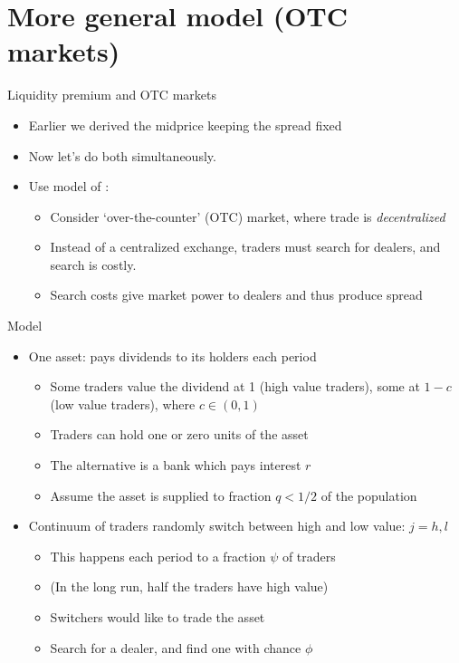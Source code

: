 \documentclass[english,10pt
,aspectratio=169
]{beamer}
\begin{document}
\section{More general model (OTC markets)}

\begin{frame}{Liquidity premium and OTC markets}
	\begin{itemize}
		\item Earlier we derived the midprice keeping the spread fixed
		\item Now let's do both simultaneously.
		\item Use model of \citet*{duffie_over--counter_2005,duffie_valuation_2007}:
		\begin{itemize}
			\item Consider `over-the-counter' (OTC) market, where trade is \textit{decentralized}
			\item Instead of a centralized exchange, traders must search for dealers, and search is costly.
			\item Search costs give market power to dealers and thus produce spread
		\end{itemize}
	\end{itemize}
\end{frame}


\begin{frame}{Model}
	\begin{itemize}
		\item One asset: pays dividends to its holders each period
		\begin{itemize}
			\item Some traders value the dividend at 1 (high value traders), some at $1-c$ (low value traders), where $c \in (0,1)$
			\item Traders can hold \alert{one} or \alert{zero units} of the asset
			\item The alternative is a bank which pays interest $r$
			\item Assume the asset is supplied to fraction $q<1/2$ of the population
		\end{itemize}
		\item Continuum of traders randomly switch between high and low value: $j=h,l$
		\begin{itemize}
			\item This happens each period to a fraction $\psi$ of traders
			\item (In the long run, half the traders have high value)
			\item Switchers would like to trade the asset
			\item Search for a dealer, and find one with chance $\phi$
		\end{itemize}
	\end{itemize}
\end{frame}
\end{document}
